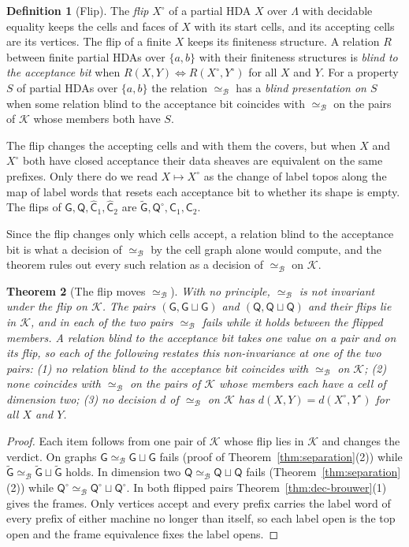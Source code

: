 \documentclass{lmcs}
\newtheorem{theorem}{Theorem}[section]
\theoremstyle{definition}
\newtheorem{definition}[theorem]{Definition}
\theoremstyle{remark}
\newcommand{\ab}{\{a,b\}}
\providecommand{\dsum}{\sqcup}
\providecommand{\Cls}{\mathcal{K}}
\providecommand{\wQ}{\mathsf{Q}}
\providecommand{\eqB}{\simeq_{\mathcal{B}}}
\providecommand{\dsum}{\sqcup}
\providecommand{\wG}{\mathsf{G}}
\providecommand{\wGt}{\tilde{\mathsf{G}}}
\providecommand{\wQ}{\mathsf{Q}}
\providecommand{\wC}[1]{\mathsf{C}_{#1}}
\providecommand{\wCh}[1]{\hat{\mathsf{C}}_{#1}}
\begin{document}
\begin{definition}[Flip]\label{def:flip}
The \emph{flip} $X^\circ$ of a partial HDA $X$ over $\Lambda$ with decidable equality keeps the cells and faces of $X$
with its start cells, and its accepting cells are its vertices. The flip of a finite $X$ keeps
its finiteness structure. A relation $R$ between finite partial HDAs over $\ab$ with their
finiteness structures is \emph{blind to the acceptance bit} when $R(X,Y)\iff R(X^\circ,Y^\circ)$ for all $X$ and
$Y$. For a property $S$ of partial HDAs over
$\ab$ the relation $\eqB$ has a \emph{blind presentation on $S$} when some relation blind to the acceptance bit
coincides with $\eqB$ on the pairs of $\Cls$ whose members both have $S$.
\end{definition}

The flip changes the accepting cells and with them the covers, but when $X$ and $X^\circ$ both have closed acceptance
their data sheaves are equivalent on the same prefixes.
Only there do we read $X\mapsto X^\circ$ as the change of label topos along the map of label words that resets each
acceptance bit to whether its shape is empty. The flips of $\wG,\wQ,\wCh{1},\wCh{2}$ are $\wGt,\wQ^\circ,\wC{1},\wC{2}$.

Since the flip changes only which cells accept, a relation blind to the acceptance bit is what a decision of $\eqB$
by the cell graph alone would compute, and the theorem rules out every such relation as
a decision of $\eqB$ on $\Cls$.

\begin{theorem}[The flip moves $\eqB$]\label{thm:flip-blind}
With no principle, $\eqB$ is not invariant under the flip on $\Cls$. The pairs $(\wG,\wG\dsum\wG)$ and
$(\wQ,\wQ\dsum\wQ)$ and their flips lie in $\Cls$, and in each of the two pairs $\eqB$ fails while it holds between the
flipped members. A relation blind to the
acceptance bit takes one value on a pair and on its flip, so each of the following restates this non-invariance at one
of the two pairs:
(1) no relation blind to the acceptance bit coincides with $\eqB$ on $\Cls$;
(2) none coincides with $\eqB$ on the pairs of $\Cls$ whose members each have a cell of dimension
two;
(3) no decision $d$ of $\eqB$ on $\Cls$ has $d(X,Y)=d(X^\circ,Y^\circ)$ for all $X$ and
$Y$.
\end{theorem}

\begin{proof}
Each item follows from one pair of $\Cls$ whose flip lies in $\Cls$ and changes the verdict. On graphs
$\wG\eqB\wG\dsum\wG$ fails (proof of Theorem~\ref{thm:separation}(2)) while $\wGt\eqB\wGt\dsum\wGt$
holds.
In dimension two $\wQ\eqB\wQ\dsum\wQ$ fails (Theorem~\ref{thm:separation}(2)) while
$\wQ^\circ\eqB\wQ^\circ\dsum\wQ^\circ$.
In both flipped pairs Theorem~\ref{thm:dec-brouwer}(1) gives the frames. Only vertices accept and every prefix
carries the label word of every prefix of either machine no longer than itself, so each label open is the top open
and the frame equivalence fixes the label opens.
\end{proof}
\end{document}
